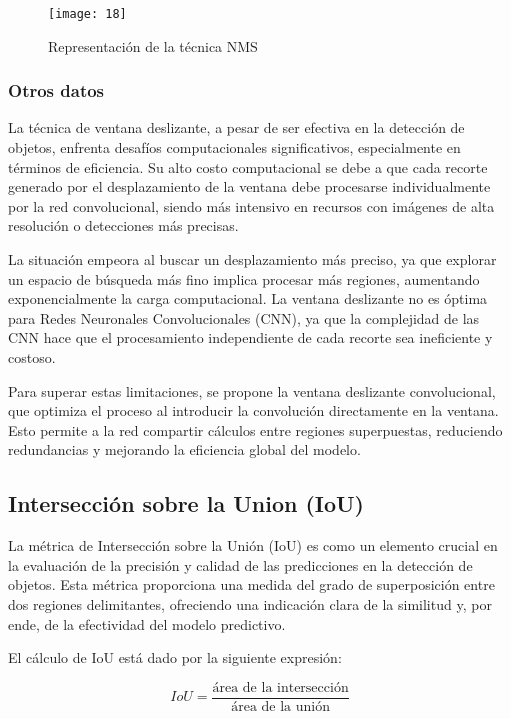 	\begin{figure}[ht]
	    \centering
		\texttt{[image: 18]}
		\caption{Representación de la técnica NMS}
	\end{figure}
	
	\subsubsection{Otros datos}
	La técnica de ventana deslizante, a pesar de ser efectiva en la detección de objetos, enfrenta desafíos computacionales significativos, especialmente en términos de eficiencia. Su alto costo computacional se debe a que cada recorte generado por el desplazamiento de la ventana debe procesarse individualmente por la red convolucional, siendo más intensivo en recursos con imágenes de alta resolución o detecciones más precisas.

	La situación empeora al buscar un desplazamiento más preciso, ya que explorar un espacio de búsqueda más fino implica procesar más regiones, aumentando exponencialmente la carga computacional. La ventana deslizante no es óptima para Redes Neuronales Convolucionales (CNN), ya que la complejidad de las CNN hace que el procesamiento independiente de cada recorte sea ineficiente y costoso.

	Para superar estas limitaciones, se propone la ventana deslizante convolucional, que optimiza el proceso al introducir la convolución directamente en la ventana. Esto permite a la red compartir cálculos entre regiones superpuestas, reduciendo redundancias y mejorando la eficiencia global del modelo.

	\subsection{Intersección sobre la Union (IoU)}
	La métrica de Intersección sobre la Unión (IoU) es como un elemento crucial en la evaluación de la precisión y calidad de las predicciones en la detección de objetos. Esta métrica proporciona una medida del grado de superposición entre dos regiones delimitantes, ofreciendo una indicación clara de la similitud y, por ende, de la efectividad del modelo predictivo.
	\pagebreak
	
	El cálculo de IoU está dado por la siguiente expresión:
	
	\begin{equation*}
    	IoU = \frac{\text{área de la intersección}}{\text{área de la unión}}
	\end{equation*}
	
